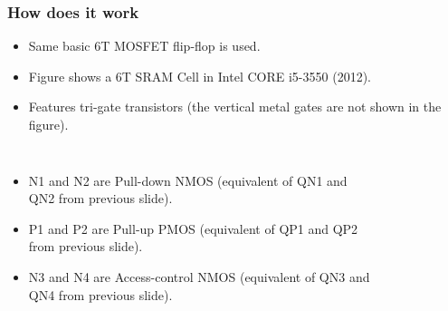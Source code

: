 \documentclass{beamer}
\begin{document}
\begin{frame}
  \frametitle{How does it work}
  \begin{itemize}
  \item Same basic 6T MOSFET flip-flop is used.
  \item Figure shows a 6T SRAM Cell in Intel CORE i5-3550 (2012).
  \item Features tri-gate transistors (the vertical metal gates are not shown in the figure).
  \end{itemize}
  \begin{columns}[c]
    \begin{itemize}
    \item N1 and N2 are Pull-down NMOS (equivalent of QN1 and QN2 from previous slide).
    \item P1 and P2 are Pull-up PMOS (equivalent of QP1 and QP2 from previous slide).
    \item N3 and N4 are Access-control NMOS (equivalent of QN3 and QN4 from previous slide).
    \end{itemize}
    
    \begin{figure}
      \noindent{}
    \end{figure}
  \end{columns}
\end{frame}

\end{document}
